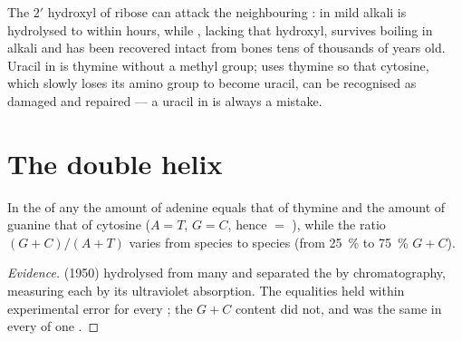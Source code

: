 \begin{example}\label{ex:b1:nucleic-acids:fragile}
The $2'$ hydroxyl of ribose can attack the neighbouring : in mild alkali  is hydrolysed to  within hours,
while , lacking that hydroxyl, survives boiling in alkali and has
been recovered intact from bones tens of thousands of years old. Uracil
in  is thymine without a methyl group;  uses thymine so that
cytosine, which slowly loses its amino group to become uracil, can be
recognised as damaged and repaired --- a uracil in  is always a
mistake.
\end{example}

\section{The double helix}

\begin{proposition}\label{prop:b1:nucleic-acids:chargaff}
In the  of any  the amount of adenine equals that of
thymine and the amount of guanine that of cytosine ($A = T$,
$G = C$, hence  $=$ ), while the ratio $(G + C)/(A + T)$
varies from species to species (from \qty{25}{\%} to \qty{75}{\%}
$G + C$).
\end{proposition}
\begin{proof}[Evidence]
 (1950) hydrolysed  from many  and separated the
 by chromatography, measuring each by its ultraviolet absorption.
The equalities held within experimental error for every ; the
$G + C$ content did not, and was the same in every  of one
.
\end{proof}

